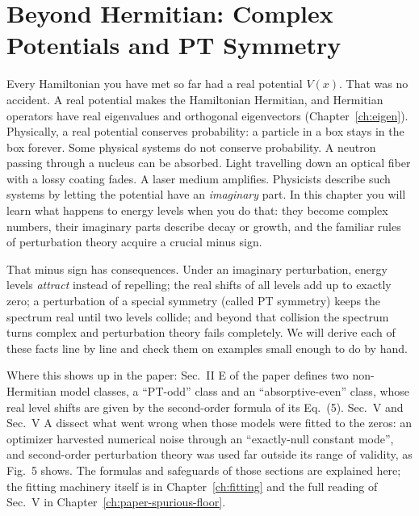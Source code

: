 \chapter{Beyond Hermitian: Complex Potentials and PT Symmetry}\label{ch:non-hermitian}

\begin{chapterintro}
Every Hamiltonian you have met so far had a real potential $V(x)$. That was no accident. A real potential makes the Hamiltonian Hermitian, and Hermitian operators have real eigenvalues and orthogonal eigenvectors (Chapter~\ref{ch:eigen}). Physically, a real potential conserves probability: a particle in a box stays in the box forever. Some physical systems do not conserve probability. A neutron passing through a nucleus can be absorbed. Light travelling down an optical fiber with a lossy coating fades. A laser medium amplifies. Physicists describe such systems by letting the potential have an \emph{imaginary} part. In this chapter you will learn what happens to energy levels when you do that: they become complex numbers, their imaginary parts describe decay or growth, and the familiar rules of perturbation theory acquire a crucial minus sign.

That minus sign has consequences. Under an imaginary perturbation, energy levels \emph{attract} instead of repelling; the real shifts of all levels add up to exactly zero; a perturbation of a special symmetry (called PT symmetry) keeps the spectrum real until two levels collide; and beyond that collision the spectrum turns complex and perturbation theory fails completely. We will derive each of these facts line by line and check them on examples small enough to do by hand.

Where this shows up in the paper: Sec.~II E of the paper defines two non-Hermitian model classes, a ``PT-odd'' class and an ``absorptive-even'' class, whose real level shifts are given by the second-order formula of its Eq.~(5). Sec.~V and Sec.~V A dissect what went wrong when those models were fitted to the zeros: an optimizer harvested numerical noise through an ``exactly-null constant mode'', and second-order perturbation theory was used far outside its range of validity, as Fig.~5 shows. The formulas and safeguards of those sections are explained here; the fitting machinery itself is in Chapter~\ref{ch:fitting} and the full reading of Sec.~V in Chapter~\ref{ch:paper-spurious-floor}.
\end{chapterintro}

